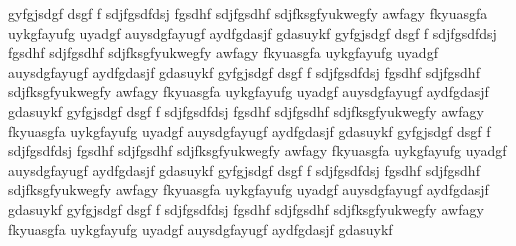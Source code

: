 gyfgjsdgf dsgf f sdjfgsdfdsj fgsdhf sdjfgsdhf sdjfksgfyukwegfy awfagy fkyuasgfa uykgfayufg uyadgf auysdgfayugf aydfgdasjf gdasuykf gyfgjsdgf dsgf f sdjfgsdfdsj fgsdhf sdjfgsdhf sdjfksgfyukwegfy awfagy fkyuasgfa uykgfayufg uyadgf auysdgfayugf aydfgdasjf gdasuykf gyfgjsdgf dsgf f sdjfgsdfdsj fgsdhf sdjfgsdhf sdjfksgfyukwegfy awfagy fkyuasgfa uykgfayufg uyadgf auysdgfayugf aydfgdasjf gdasuykf gyfgjsdgf dsgf f sdjfgsdfdsj fgsdhf sdjfgsdhf sdjfksgfyukwegfy awfagy fkyuasgfa uykgfayufg uyadgf auysdgfayugf aydfgdasjf gdasuykf gyfgjsdgf dsgf f sdjfgsdfdsj fgsdhf sdjfgsdhf sdjfksgfyukwegfy awfagy fkyuasgfa uykgfayufg uyadgf auysdgfayugf aydfgdasjf gdasuykf gyfgjsdgf dsgf f sdjfgsdfdsj fgsdhf sdjfgsdhf sdjfksgfyukwegfy awfagy fkyuasgfa uykgfayufg uyadgf auysdgfayugf aydfgdasjf gdasuykf gyfgjsdgf dsgf f sdjfgsdfdsj fgsdhf sdjfgsdhf sdjfksgfyukwegfy awfagy fkyuasgfa uykgfayufg uyadgf auysdgfayugf aydfgdasjf gdasuykf 

\lipsum